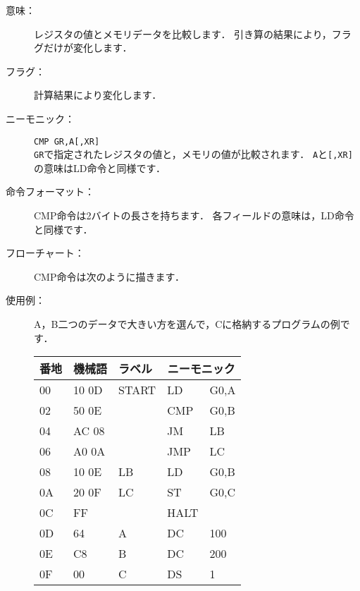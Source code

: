 \begin{description}
\item[意味：]レジスタの値とメモリデータを比較します．
引き算の結果により，フラグだけが変化します．

\item[フラグ：]計算結果により変化します．

\item[ニーモニック：]{\tt CMP  GR,A[,XR]} \\
{\tt GR}で指定されたレジスタの値と，メモリの値が比較されます．
{\tt A}と{\tt [,XR]}の意味はLD命令と同様です．

\item[命令フォーマット：]CMP命令は2バイトの長さを持ちます．
各フィールドの意味は，LD命令と同様です．


\item[フローチャート：]CMP命令は次のように描きます．

\begin{center}
\end{center}

\item[使用例：]
A，B二つのデータで大きい方を選んで，Cに格納するプログラムの例です．

{\tt\begin{center}
\begin{tabular}{|l|l|l|l l|} \hline
番地 & 機械語 & ラベル & \multicolumn{2}{|c|}{ニーモニック} \\
\hline
00 & 10 0D & START & LD   & G0,A \\
02 & 50 0E &       & CMP  & G0,B \\
04 & AC 08 &       & JM   & LB   \\
06 & A0 0A &       & JMP  & LC   \\
08 & 10 0E & LB    & LD   & G0,B \\
0A & 20 0F & LC    & ST   & G0,C \\
0C & FF    &       & HALT & \\
0D & 64    & A     & DC   & 100  \\
0E & C8    & B     & DC   & 200  \\
0F & 00    & C     & DS   & 1    \\
\hline
\end{tabular}
\end{center}}
\end{description}

